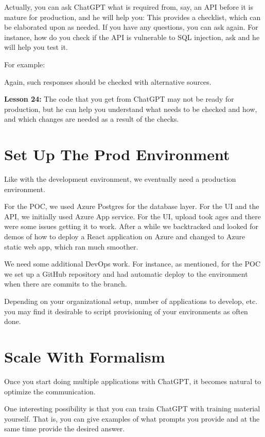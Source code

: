 \documentclass[runningheads]{llncs}
\begin{document}
Actually, you can ask ChatGPT what is required from, say, an API before it is mature for production, and he will help you:
This provides a checklist, which can be elaborated upon as needed. If you have any questions, you can ask again. For instance, how do you check if the API is vulnerable to SQL injection, ask and he will help you test it.

For example:
  
Again, such responses should be checked with alternative sources.

\textbf{Lesson 24:} The code that you get from ChatGPT may not be ready for production, but he can help you understand what needs to be checked and how, and which changes are needed as a result of the checks.

\section{Set Up The Prod Environment}

Like with the development environment, we eventually need a production environment.

For the POC, we used Azure Postgres for the database layer. For the UI and the API, we initially used Azure App service. For the UI, upload took ages and there were some issues getting it to work. After a while we backtracked and looked for demos of how to deploy a React application on Azure and changed to Azure static web app, which ran much smoother.

We need some additional DevOps work. For instance, as mentioned, for the POC we set up a GitHub repository and had automatic deploy to the environment when there are commits to the branch.

Depending on your organizational setup, number of applications to develop, etc. you may find it desirable to script provisioning of your environments as often done.

\section{Scale With Formalism}

Once you start doing multiple applications with ChatGPT, it becomes natural to optimize the communication.

One interesting possibility is that you can train ChatGPT with training material yourself. That is, you can give examples of what prompts you provide and at the same time provide the desired answer.
\end{document}
